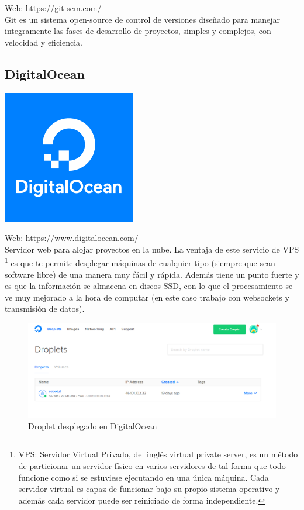 Web: \url{https://git-scm.com/}\\

Git es un sistema open-source de control de versiones diseñado para manejar integramente las fases de desarrollo de proyectos, simples y complejos, con velocidad y eficiencia.\\

\subsection{DigitalOcean}

\begin{center}\includegraphics[scale=0.35]{imagenes/docean-logo.png}\end{center}

Web: \url{https://www.digitalocean.com/}\\

Servidor web para alojar proyectos en la nube. La ventaja de este servicio de VPS \footnote{ VPS: Servidor Virtual Privado, del inglés virtual private server, es un método de particionar un servidor
físico en varios servidores de tal forma que todo funcione como si se estuviese ejecutando en una única máquina. Cada servidor virtual es capaz de funcionar bajo su propio sistema operativo y
además cada servidor puede ser reiniciado de forma independiente.} es que te permite desplegar máquinas de cualquier tipo (siempre que sean software libre) de una manera muy fácil y rápida. 
Además tiene un punto fuerte y es que la información se almacena en discos SSD, con lo que el procesamiento se ve muy mejorado a la hora de computar (en este caso trabajo con websockets y 
transmisión de datos).\\

\begin{figure}[H]
\begin{center}
\includegraphics[scale=0.45]{imagenes/droplets.png}
\caption{Droplet desplegado en DigitalOcean}
\end{center}
\end{figure}


